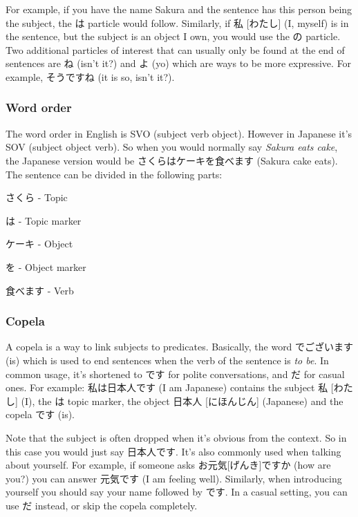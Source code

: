 \documentclass{article}
\begin{document}
\begin{CJK}{UTF8}{min}
\begin{multicols*}{3}
For example, if you have the name Sakura and the sentence has this person being the subject, the は particle would follow. Similarly, if 私 [わたし] (I, myself) is in the sentence, 
but the subject is an object I own, you would use the の particle. Two additional particles of interest that can usually only be found at the end of sentences are ね (isn't it?) and 
よ (yo) which are ways to be more expressive. For example, そうですね (it is so, isn't it?).

\subsubsection{Word order}

The word order in English is SVO (subject verb object). However in Japanese it's SOV (subject object verb). So when you would normally say \textit{Sakura eats cake}, the Japanese 
version would be さくらはケーキを食べます (Sakura cake eats). The sentence can be divided in the following parts:

\begin{colorize}
\item さくら - Topic
\item は - Topic marker
\item ケーキ - Object
\item を - Object marker
\item 食べます - Verb
\end{colorize}

\subsubsection{Copela}

A copela is a way to link subjects to predicates. Basically, the word でございます (is) which is used to end sentences when the verb of the sentence is \textit{to be}. In common usage, 
it's shortened to です for polite conversations, and だ for casual ones. For example: 私は日本人です (I am Japanese) contains the subject 私 [わたし] (I), the は topic marker, the 
object 日本人 [にほんじん] (Japanese) and the copela です (is).

Note that the subject is often dropped when it's obvious from the context. So in this case you would just say 日本人です. It's also commonly used when talking about yourself. For 
example, if someone asks お元気[げんき]ですか (how are you?) you can answer 元気です (I am feeling well). Similarly, when introducing yourself you should say your name followed by 
です. In a casual setting, you can use だ instead, or skip the copela completely.


\end{multicols*}
\end{CJK}
\end{document}
